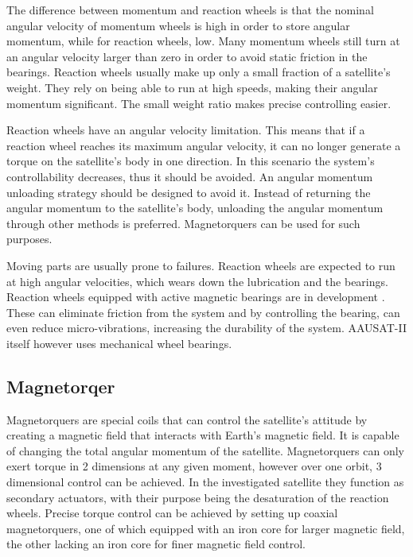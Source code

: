 The difference between momentum and reaction wheels is that the nominal angular velocity of momentum wheels is high in order to store angular momentum, while for reaction wheels, low. Many momentum wheels still turn at an angular velocity larger than zero in order to avoid static friction in the bearings. Reaction wheels usually make up only a small fraction of a satellite's weight. They rely on being able to run at high speeds, making their angular momentum significant. The small weight ratio makes precise controlling easier.




Reaction wheels have an angular velocity limitation. This means that if a reaction wheel reaches its maximum angular velocity, it can no longer generate a torque on the satellite's body in one direction. In this scenario the system's controllability decreases, thus it should be avoided. An angular momentum unloading strategy should be designed to avoid it. Instead of returning the angular momentum to the satellite's body, unloading the angular momentum through other methods is preferred. Magnetorquers can be used for such purposes.

Moving parts are usually prone to failures. Reaction wheels are expected to run at high angular velocities, which wears down the lubrication and the bearings. Reaction wheels equipped with active magnetic bearings are in development \cite{MagneticReactWheel}. These can eliminate friction from the system and by controlling the bearing, can even reduce micro-vibrations, increasing the durability of the system. AAUSAT-II itself however uses mechanical wheel bearings.



\subsection{Magnetorqer}

Magnetorquers are special coils that can control the satellite's attitude by creating a magnetic field that interacts with Earth's magnetic field. It is capable of changing the total angular momentum of the satellite. Magnetorquers can only exert torque in 2 dimensions at any given moment, however over one orbit, 3 dimensional control can be achieved. In the investigated satellite they function as secondary actuators, with their purpose being the desaturation of the reaction wheels. Precise torque control can be achieved by setting up coaxial magnetorquers, one of which equipped with an iron core for larger magnetic field, the other lacking an iron core for finer magnetic field control.
